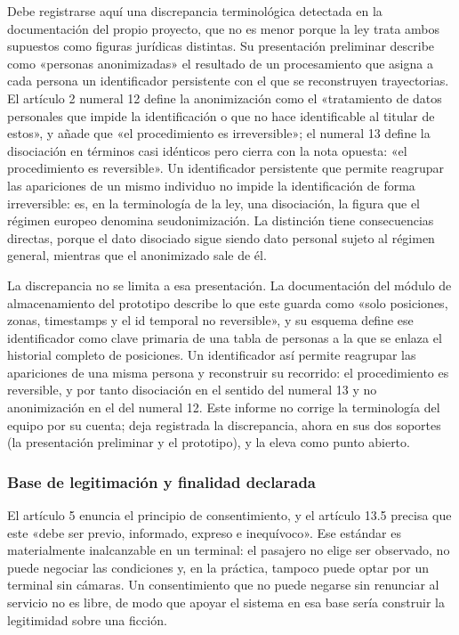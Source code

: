 Debe registrarse aquí una discrepancia terminológica detectada en la
documentación del propio proyecto, que no es menor porque la ley trata
ambos supuestos como figuras jurídicas distintas. Su presentación
preliminar describe como «personas anonimizadas» el resultado de un
procesamiento que asigna a cada persona un identificador persistente con
el que se reconstruyen trayectorias. El artículo 2 numeral 12 define la
anonimización como el «tratamiento de datos personales que impide la
identificación o que no hace identificable al titular de estos», y añade
que «el procedimiento es irreversible»; el numeral 13 define la
disociación en términos casi idénticos pero cierra con la nota opuesta:
«el procedimiento es reversible». Un identificador persistente que
permite reagrupar las apariciones de un mismo individuo no impide la
identificación de forma irreversible: es, en la terminología de la ley,
una disociación, la figura que el régimen europeo denomina
seudonimización. La distinción tiene consecuencias directas, porque el
dato disociado sigue siendo dato personal sujeto al régimen general,
mientras que el anonimizado sale de él.

La discrepancia no se limita a esa presentación. La documentación del
módulo de almacenamiento del prototipo describe lo que este guarda como
«solo posiciones, zonas, timestamps y el id temporal no reversible», y
su esquema define ese identificador como clave primaria de una tabla de
personas a la que se enlaza el historial completo de posiciones. Un
identificador así permite reagrupar las apariciones de una misma persona
y reconstruir su recorrido: el procedimiento es reversible, y por tanto
disociación en el sentido del numeral 13 y no anonimización en el del
numeral 12. Este informe no corrige la terminología del equipo por su
cuenta; deja registrada la discrepancia, ahora en sus dos soportes (la
presentación preliminar y el prototipo), y la eleva como punto abierto.

\subsubsection{Base de legitimación y finalidad declarada}

El artículo 5 enuncia el principio de consentimiento, y el artículo 13.5
precisa que este «debe ser previo, informado, expreso e inequívoco». Ese
estándar es materialmente inalcanzable en un terminal: el pasajero no
elige ser observado, no puede negociar las condiciones y, en la
práctica, tampoco puede optar por un terminal sin cámaras. Un
consentimiento que no puede negarse sin renunciar al servicio no es
libre, de modo que apoyar el sistema en esa base sería construir la
legitimidad sobre una ficción.

